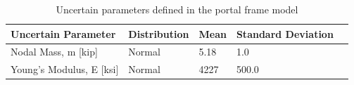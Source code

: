 \begin{table}[hbt!]                       
  \centering
\begin{adjustbox}{max width=\textwidth}            
  \begin{tabular}{lllll}                    
    \toprule          
      Uncertain Parameter & 	Distribution	 &  Mean  &  Standard Deviation \\ \hline
	Nodal Mass, m [kip]	 & Normal & 	5.18	 & 1.0 \\ \hline
	Young’s Modulus, E [ksi] & 	Normal	 & 4227	 & 500.0 \\ \hline
  \end{tabular}
\end{adjustbox}
  \caption{Uncertain parameters defined in the portal frame model}             
  \label{tab:uncertainty}                 
\end{table}


